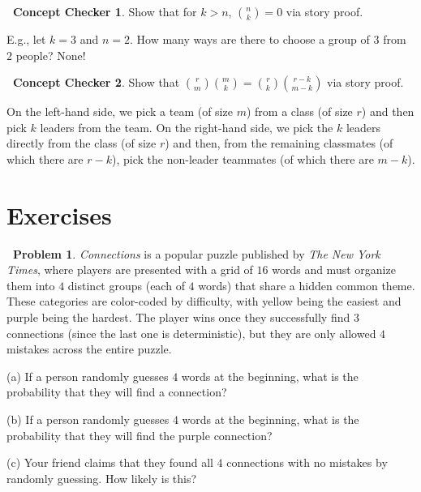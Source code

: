 \documentclass[12pt,oneside]{article}
\theoremstyle{definition}
\newtheorem{problem}{\faPen \ Problem}
\newtheorem{concept}{\faPen \ Concept Checker}
\theoremstyle{remark}
\begin{document}
\begin{concept}
Show that for $k > n$, $\binom{n}{k} = 0$ via story proof.
\end{concept}

\begin{solutionbox}
E.g., let $k = 3$ and $n = 2$. How many ways are there to choose a group of $3$ from $2$ people? None!
\end{solutionbox}

\begin{concept}
Show that $\binom{r}{m} \binom{m}{k} = \binom{r}{k} \binom{r - k}{m - k}$ via story proof.
\end{concept}

\begin{solutionbox}
On the left-hand side, we pick a team (of size $m$) from a class (of size $r$) and then pick $k$ leaders from the team. On the right-hand side, we pick the $k$ leaders directly from the class (of size $r$) and then, from the remaining classmates (of which there are $r - k$), pick the non-leader teammates (of which there are $m - k$).
\end{solutionbox}

\section{Exercises}

\begin{problem}
\textit{Connections} is a popular puzzle published by \textit{The New York Times}, where players are presented with a grid of $16$ words and must organize them into $4$ distinct groups (each of $4$ words) that share a hidden common theme. These categories are color-coded by difficulty, with yellow being the easiest and purple being the hardest. The player wins once they successfully find $3$ connections (since the last one is deterministic), but they are only allowed $4$ mistakes across the entire puzzle.

(a) If a person randomly guesses $4$ words at the beginning, what is the probability that they will find a connection?

(b) If a person randomly guesses $4$ words at the beginning, what is the probability that they will find the purple connection?

(c) Your friend claims that they found all $4$ connections with no mistakes by randomly guessing. How likely is this?
\end{problem}
\end{document}
